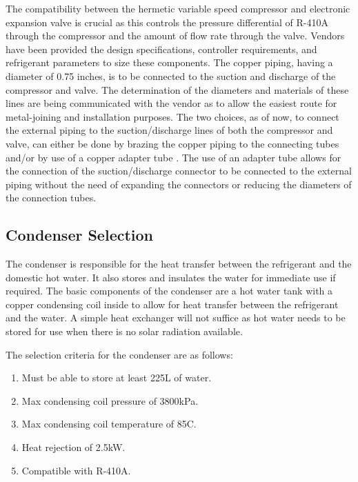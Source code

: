 \medskip
The compatibility between the hermetic variable speed compressor and electronic expansion valve is crucial as this controls the pressure differential of R-410A through the compressor and the amount of flow rate through the valve. Vendors have been provided the design specifications, controller requirements, and refrigerant parameters to size these components. The copper piping, having a diameter of 0.75 inches, is to be connected to the suction and discharge of the compressor and valve. The determination of the diameters and materials of these lines are being communicated with the vendor as to allow the easiest route for metal-joining and installation purposes. The two choices, as of now, to connect the external piping to the suction/discharge lines of both the compressor and valve, can either be done by brazing the copper piping to the connecting tubes and/or by use of a copper adapter tube \cite{exv_selection}. The use of an adapter tube allows for the connection of the suction/discharge connector to be connected to the external piping without the need of expanding the connectors or reducing the diameters of the connection tubes.

\subsection{Condenser Selection}

The condenser is responsible for the heat transfer between the refrigerant and the domestic hot water. It also stores and insulates the water for immediate use if required. The basic components of the condenser are a hot water tank with a copper condensing coil inside to allow for heat transfer between the refrigerant and the water. A simple heat exchanger will not suffice as hot water needs to be stored for use when there is no solar radiation available.

\medskip
The selection criteria for the condenser are as follows:

\medskip
\begin{enumerate}[itemsep=3mm, parsep=-1mm, label=\roman*.]
    \item Must be able to store at least 225L of water.
    \item Max condensing coil pressure of 3800kPa.
    \item Max condensing coil temperature of 85\textdegree C.
    \item Heat rejection of 2.5kW.
    \item Compatible with R-410A.
\end{enumerate}

